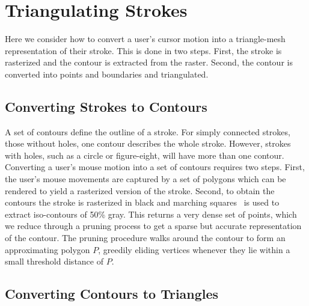 \documentclass[conference]{acmsiggraph}
\begin{document}
\section{Triangulating Strokes}

Here we consider how to convert a user's cursor motion into a triangle-mesh representation
of their stroke. This is done in two steps. First, the stroke is rasterized and the
contour is extracted from the raster. Second, the contour is converted into points and
boundaries and triangulated.

\subsection{Converting Strokes to Contours}

A set of contours define the outline of a stroke. For simply connected strokes, those without holes, 
one contour describes the whole stroke. However, strokes with holes, such as a circle or 
figure-eight, will have more than one contour.
Converting a user's mouse motion into a set of contours requires two steps.
First, the user's mouse movements are captured by a set of polygons which can be
rendered to yield a rasterized version of the stroke. 
Second, to obtain the contours the stroke is rasterized in black and marching squares~\cite{lorensen1987}
is used to extract iso-contours of 50\% gray. This returns a very dense set of points,
which we reduce through a pruning process to
get a sparse but accurate representation of the contour.
The pruning procedure walks around the contour to form an approximating polygon $P$,
greedily eliding vertices whenever they lie within a small threshold distance of $P$. 



\subsection{Converting Contours to Triangles}
\label{sec:contours}
\end{document}
